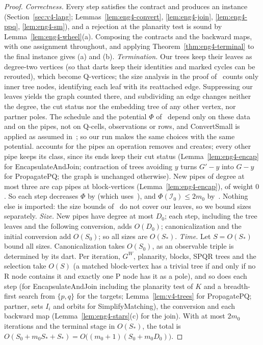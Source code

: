 \begin{proof}
\emph{Correctness.} Every step satisfies the contract and produces an
instance (Section~\ref{sec:v4-lang}; Lemmas~\ref{lem:eng4-convert},
\ref{lem:eng4-join}, \ref{lem:eng4-ppq}, \ref{lem:eng4-sm}), and a rejection
at the planarity test is sound by Lemma~\ref{lem:eng4-wheel}(a). Composing
the contracts and the backward maps, with one assignment throughout, and
applying Theorem~\ref{thm:eng4-terminal} to the final instance gives (a) and
(b).
\emph{Termination.} Our trees keep their leaves as degree-two vertices
(so that darts keep their identities and marked cycles can be rerouted),
which become Q-vertices; the size analysis in the proof
of~\cite[Lemma~10]{BFR21} counts only inner tree nodes, identifying each
leaf with its reattached edge. Suppressing our leaves yields the graph
counted there, and subdividing an edge
changes neither the degree, the cut status nor the embedding tree of any
other vertex, nor partner poles. The schedule and the potential $\Phi$
of~\cite[Section~3.6]{BFR21} depend only on these data and on the pipes, not
on Q-cells, observations or rows, and ConvertSmall is applied as assumed
in~\cite{BFR21}; so our run makes the same choices with the same
potential. \cite[Lemma~10]{BFR21} accounts for the pipes an
operation removes and creates; every other pipe keeps its class, since its
ends keep their cut status (Lemma~\ref{lem:eng4-encap} for
EncapsulateAndJoin; contraction of trees avoiding $y$ turns $G'-y$ into
$G-y$ for PropagatePQ; the graph is unchanged otherwise). New pipes of degree
at most three are cap pipes at block-vertices (Lemma~\ref{lem:eng4-encap}),
of weight $0$. So each step decreases $\Phi$ by
\cite[Lemma~10(i)]{BFR21} (which uses~\cite[Lemma~9]{BFR21}), and
$\Phi(\mathcal I_0)\le2m_0$ by~\cite[Lemma~11]{BFR21}. Nothing else is
imported: the size bounds of~\cite[Lemma~10(ii),(iii) and Theorem~12]{BFR21}
do not cover our leaves, so we bound sizes separately.
\emph{Size.} New pipes have degree at most $D_0$; each step, including the
tree leaves and the following conversion, adds $O(D_0)$; canonicalization
and the initial conversion add $O(S_0)$; so all sizes are $O(S_\ast)$.
\emph{Time.} Let $S=O(S_\ast)$ bound all sizes. Canonicalization takes
$O(S_0)$, as an observable triple is determined by its dart. Per iteration,
$G^W$, planarity, blocks, SPQR trees and the selection take $O(S)$ (a matched
block-vertex has a trivial tree if and only if no R node contains it and
exactly one P node has it as a pole), and so does each step (for
EncapsulateAndJoin including the planarity test of $K$ and a breadth-first
search from $\{p,q\}$ for the targets; Lemma~\ref{lem:v4-trees} for
PropagatePQ; partner, sets $I_i$ and orbits for SimplifyMatching), the
conversion and each backward map
(Lemma~\ref{lem:eng4-stars}(c) for the join). With at most $2m_0$
iterations and the terminal stage in $O(S_\ast)$, the total is
$O(S_0+m_0S_\ast+S_\ast)=O\bigl((m_0+1)(S_0+m_0D_0)\bigr)$.
\end{proof}

